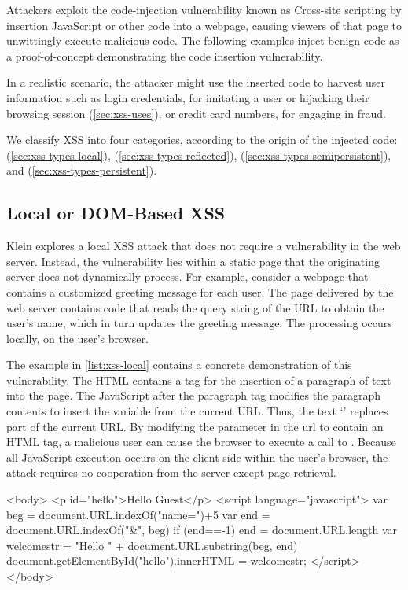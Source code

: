 Attackers exploit the code-injection vulnerability known as Cross-site scripting by insertion JavaScript or other code into a webpage, causing viewers of that page to unwittingly execute malicious code.
The following examples inject benign code as a proof-of-concept demonstrating the code insertion vulnerability.

In a realistic scenario, the attacker might use the inserted code to harvest user information such as login credentials, for imitating a user or hijacking their browsing session (\autoref{sec:xss-uses}), or credit card numbers, for engaging in fraud.

We classify XSS into four categories, according to the origin of the injected code:  (\autoref{sec:xss-types-local}),  (\autoref{sec:xss-types-reflected}),  (\autoref{sec:xss-types-semipersistent}), and  (\autoref{sec:xss-types-persistent}).

\subsection{Local or DOM-Based XSS}\label{sec:xss-types-local}

Klein \cite{localXSS} explores a local XSS attack that does not require a vulnerability in the web server.
Instead, the vulnerability lies within a static page that the originating server does not dynamically process.
For example, consider a webpage that contains a customized greeting message for each user.
The page delivered by the web server contains code that reads the query string of the URL to obtain the user's name, which in turn updates the greeting message.
The processing occurs locally, on the user's browser.

The example in \autoref{list:xss-local} contains a concrete demonstration of this vulnerability.
The HTML contains a  tag for the insertion of a paragraph of text into the page.
The JavaScript after the paragraph tag modifies the paragraph contents to insert the  variable from the current URL.
Thus, the text `' replaces part of the current URL.
By modifying the  parameter in the url to contain an HTML  tag, a malicious user can cause the browser to execute a call to .
Because all JavaScript execution occurs on the client-side within the user's browser, the attack requires no cooperation from the server except page retrieval.

\begin{jscode}
<body>
    <p id="hello">Hello Guest</p>
    <script language="javascript">
        var beg = document.URL.indexOf("name=")+5
        var end = document.URL.indexOf("\&", beg)
        if (end==-1) end = document.URL.length
        var welcomestr = "Hello " + document.URL.substring(beg, end)
        document.getElementById("hello").innerHTML = welcomestr;
    </script>
</body>
\end{jscode}

